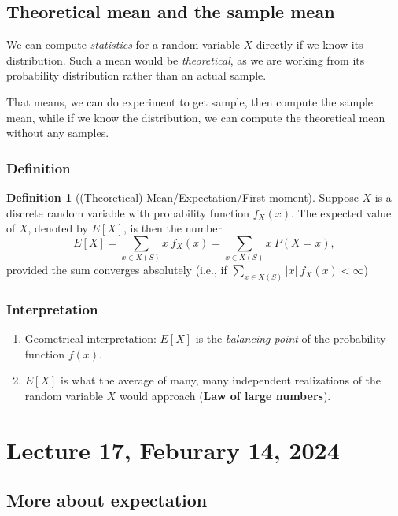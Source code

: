 \documentclass[
]{book}
\providecommand{\tightlist}{%
  \setlength{\itemsep}{0pt}\setlength{\parskip}{0pt}}
\theoremstyle{definition}
\newtheorem{definition}{Definition}[chapter]
\theoremstyle{definition}
\theoremstyle{definition}
\theoremstyle{definition}
\theoremstyle{remark}
\begin{document}
\section{Theoretical mean and the sample mean}\label{theoretical-mean-and-the-sample-mean}

We can compute \emph{statistics} for a random variable \(X\) directly if we know its distribution. Such a mean would be \emph{theoretical}, as we are working from its probability distribution rather than an actual sample.

That means, we can do experiment to get sample, then compute the sample mean, while if we know the distribution, we can compute the theoretical mean without any samples.

\subsection{Definition}\label{definition}

\begin{definition}[(Theoretical) Mean/Expectation/First moment]
Suppose \(X\) is a discrete random variable with probability function \(f_X(x)\). The expected value of \(X\), denoted by \(E[X]\), is then the number
\[
E[X] = \sum_{x\in X(S) } x \ f_X(x) = \sum_{x\in X(S) } x \ P(X=x),
\]
provided the sum converges absolutely (i.e., if \(\sum_{x\in X(S) } |x| \ f_X(x)<\infty\))
\end{definition}

\subsection{Interpretation}\label{interpretation}

\begin{enumerate}
\def\labelenumi{\arabic{enumi}.}
\tightlist
\item
  Geometrical interpretation: \(E[X]\) is the \emph{balancing point} of the probability function \(f(x)\).
\item
  \(E[X]\) is what the average of many, many independent realizations of the random variable \(X\) would approach (\textbf{Law of large numbers}).
\end{enumerate}

\chapter{Lecture 17, Feburary 14, 2024}\label{lecture-17-feburary-14-2024}

\section{More about expectation}\label{more-about-expectation}
\end{document}
